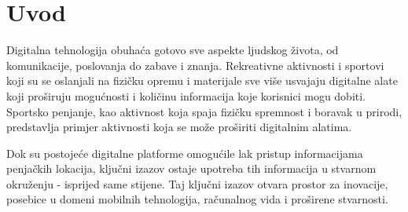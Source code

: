 \chapter{Uvod}

Digitalna tehnologija obuhaća gotovo sve aspekte ljudskog života, od komunikacije, poslovanja do zabave i znanja. Rekreativne aktivnosti i sportovi koji su se oslanjali na fizičku opremu i materijale sve više usvajaju digitalne alate koji proširuju mogućnosti i količinu informacija koje korisnici mogu dobiti. Sportsko penjanje, kao aktivnost koja spaja fizičku spremnost i boravak u prirodi, predstavlja primjer aktivnosti koja se može proširiti digitalnim alatima.

Dok su postojeće digitalne platforme omogućile lak pristup informacijama penjačkih lokacija, ključni izazov ostaje upotreba tih informacija u stvarnom okruženju - isprijed same stijene. Taj ključni izazov otvara prostor za inovacije, posebice u domeni mobilnih tehnologija, računalnog vida i proširene stvarnosti.





